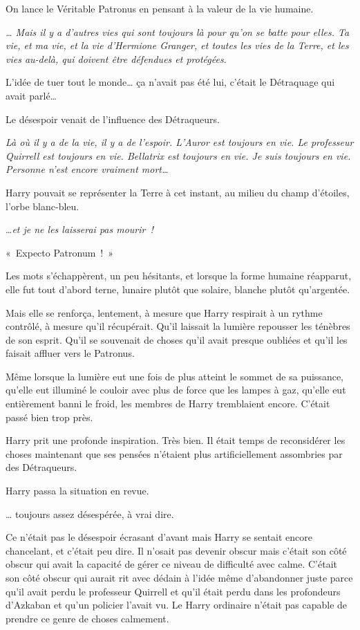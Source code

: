 On lance le Véritable Patronus en pensant à la valeur de la vie humaine.

\emph{… Mais il y a d'autres vies qui sont toujours là pour qu'on se batte pour elles. Ta vie, et ma vie, et la vie d'Hermione Granger, et toutes les vies de la Terre, et les vies au-delà, qui doivent être défendues et protégées.}

L'idée de tuer tout le monde… ça n'avait pas été lui, c'était le Détraquage qui avait parlé…

Le désespoir venait de l'influence des Détraqueurs.

\emph{Là où il y a de la vie, il y a de l'espoir. L'Auror est toujours en vie. Le professeur Quirrell est toujours en vie. Bellatrix est toujours en vie. Je suis toujours en vie. Personne n'est encore vraiment mort…}

Harry pouvait se représenter la Terre à cet instant, au milieu du champ d'étoiles, l'orbe blanc-bleu.

…\emph{et je ne les laisserai pas mourir~!}

«~Expecto Patronum~!~»

Les mots s'échappèrent, un peu hésitants, et lorsque la forme humaine réapparut, elle fut tout d'abord terne, lunaire plutôt que solaire, blanche plutôt qu'argentée.

Mais elle se renforça, lentement, à mesure que Harry respirait à un rythme contrôlé, à mesure qu'il récupérait. Qu'il laissait la lumière repousser les ténèbres de son esprit. Qu'il se souvenait de choses qu'il avait presque oubliées et qu'il les faisait affluer vers le Patronus.

Même lorsque la lumière eut une fois de plus atteint le sommet de sa puissance, qu'elle eut illuminé le couloir avec plus de force que les lampes à gaz, qu'elle eut entièrement banni le froid, les membres de Harry tremblaient encore. C'était passé bien trop près.

Harry prit une profonde inspiration. Très bien. Il était temps de reconsidérer les choses maintenant que ses pensées n'étaient plus artificiellement assombries par des Détraqueurs.

Harry passa la situation en revue.

… toujours assez désespérée, à vrai dire.

Ce n'était pas le désespoir écrasant d'avant mais Harry se sentait encore chancelant, et c'était peu dire. Il n'osait pas devenir obscur mais c'était son côté obscur qui avait la capacité de gérer ce niveau de difficulté avec calme. C'était son côté obscur qui aurait rit avec dédain à l'idée même d'abandonner juste parce qu'il avait perdu le professeur Quirrell et qu'il était perdu dans les profondeurs d'Azkaban et qu'un policier l'avait vu. Le Harry ordinaire n'était pas capable de prendre ce genre de choses calmement.

